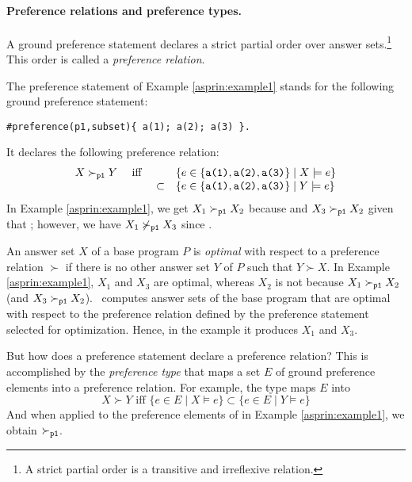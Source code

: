 \paragraph{Preference relations and preference types.}
A ground preference statement declares a 
strict partial order over answer sets.\footnote{A strict partial order is a transitive and irreflexive relation.}
This order is called a \emph{preference relation}.
\begin{example}
The preference statement of Example \ref{asprin:example1} stands for the following ground preference statement:
\begin{lstlisting}[numbers=none]
#preference(p1,subset){ a(1); a(2); a(3) }.
\end{lstlisting}
It declares the following preference relation:
\[
\begin{array}{cccl}
X \succ_{\texttt{p1}} Y & \text{ iff } &         & \{e\in \{\texttt{a(1)},\texttt{a(2)},\texttt{a(3)}\} \mid X\models e\} \\ 
                      &              & \subset & \{e\in \{\texttt{a(1)},\texttt{a(2)},\texttt{a(3)}\} \mid Y\models e\}
\end{array}
\]
In Example \ref{asprin:example1}, 
we get
$X_1\succ_{\texttt{p1}}X_2$ because 
and $X_3\succ_{\texttt{p1}}X_2$ given that ;
however, we have $X_1\not\succ_{\texttt{p1}}X_3$ since . 
\end{example}
An answer set $X$ of a base program $P$ is \emph{optimal} with respect to a preference relation $\succ$
if there is no other answer set $Y$ of $P$ such that $Y \succ X$.
In Example \ref{asprin:example1}, 
$X_1$ and $X_3$ are optimal,
whereas $X_2$ is not because $X_1 \succ_{\texttt{p1}} X_2$ (and $X_3 \succ_{\texttt{p1}} X_2$).
\asprin\ computes answer sets of the base program
that are optimal with respect to the preference relation 
defined by the preference statement selected for optimization.
Hence, in the example it produces $X_1$ and $X_3$.

But how does a preference statement declare a preference relation?
This is accomplished by the \emph{preference type}
that maps a set $E$ of ground preference elements into a preference relation.
For example, the type  maps $E$ into
\[
X \succ Y \text{ iff } \{e\in E\mid X\models e\}\subset\{e\in E\mid Y\models e\}
\]
And when applied to the preference elements of  in Example \ref{asprin:example1}, we obtain $\succ_{\texttt{p1}}$.

